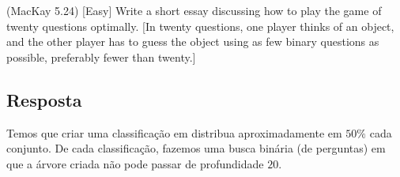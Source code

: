 (MacKay 5.24) [Easy]
Write a short essay discussing how to play the game of twenty questions optimally. [In twenty questions, one player thinks of an object, and the other player has to guess the object using as few binary questions as possible, preferably fewer than twenty.]

\subsection*{Resposta}

Temos que criar uma classificação em distribua aproximadamente em $50\%$ cada conjunto. De cada classificação, fazemos uma busca binária (de perguntas) em que a árvore criada não pode passar de profundidade $20$.